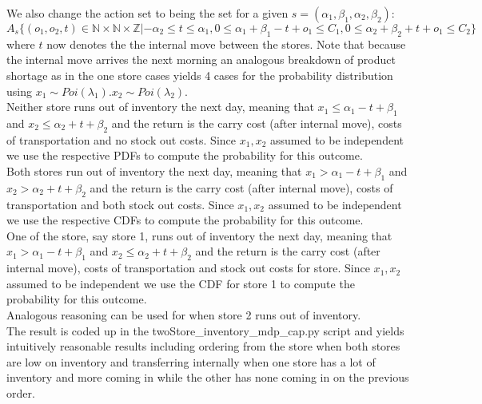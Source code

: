 \documentclass{article}[12pt]
\begin{document}
We also change the action set to being the set for a given $s =(\alpha_1,\beta_1,\alpha_2,\beta_2) $:
$$A_s \{(o_1,o_2, t) \in \mathbb{N}\times \mathbb{N}\times\mathbb{Z}|-\alpha_2\leq t\leq\alpha_1,0 \leq \alpha_1 +\beta_1- t + o_1 \leq C_1, 0 \leq \alpha_2 +\beta_2+ t + o_1 \leq C_2 \}$$
where $t$ now denotes the the internal move between the stores. Note that because the internal move arrives the next morning an analogous breakdown of product shortage as in the one store cases yields 4 cases for the probability distribution using $x_1\sim Poi(\lambda_1)$.$x_2\sim Poi(\lambda_2)$.\\
Neither store runs out of inventory the next day, meaning that $x_1\leq \alpha_1 - t + \beta_1$ and $x_2\leq \alpha_2 + t + \beta_2$ and the return is the carry cost (after internal move), costs of transportation and no stock out costs. Since $x_1,x_2$ assumed to be independent we use the respective PDFs to compute the probability for this outcome.\\
Both stores run out of inventory the next day, meaning that $x_1> \alpha_1 - t + \beta_1$ and $x_2> \alpha_2 + t + \beta_2$ and the return is the carry cost (after internal move), costs of transportation and both stock out costs. Since $x_1,x_2$ assumed to be independent we use the respective CDFs to compute the probability for this outcome.\\
One of the store, say store 1, runs out of inventory the next day, meaning that $x_1> \alpha_1 - t + \beta_1$ and $x_2\leq \alpha_2 + t + \beta_2$ and the return is the carry cost (after internal move), costs of transportation and stock out costs for store. Since $x_1,x_2$ assumed to be independent we use the CDF for store 1  to compute the probability for this outcome. \\
Analogous reasoning can be used for when store 2 runs out of inventory. \\

The result is coded up in the twoStore\_inventory\_mdp\_cap.py script and yields intuitively reasonable results including ordering from the store when both stores are low on inventory and transferring internally when one store has a lot of inventory and more coming in while the other has none coming in on the previous order.
\end{document}
